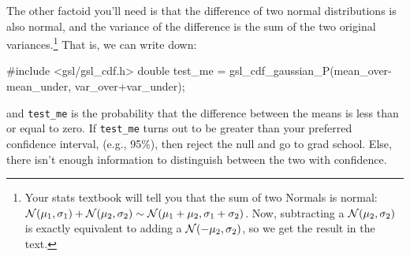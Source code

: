 The other factoid you'll need is that the difference of two normal
distributions is also normal, and the variance of the difference is
the sum of the two original variances.\footnote{Your stats textbook
will tell you that the sum of two Normals is normal: ${\cal N}(\mu_1,
\sigma_1) + {\cal N}(\mu_2, \sigma_2) \sim {\cal N}(\mu_1 + \mu_2,
\sigma_1 + \sigma_2)$. Now, subtracting a ${\cal N}(\mu_2, \sigma_2)$
is exactly equivalent to adding a ${\cal N}(-\mu_2, \sigma_2)$, so we
get the result in the text.} That is, we can write down:

#include <gsl/gsl_cdf.h>
double	test_me = gsl_cdf_gaussian_P(mean_over-mean_under, 
                                       var_over+var_under);

and {\tt test\_me} is the probability that the difference between the
means is less than or equal to zero. If {\tt test\_me} turns out to be greater
than your preferred confidence interval, (e.g., 95\%), then reject the
null and go to grad school. Else, there isn't enough information to
distinguish between the two with confidence.

